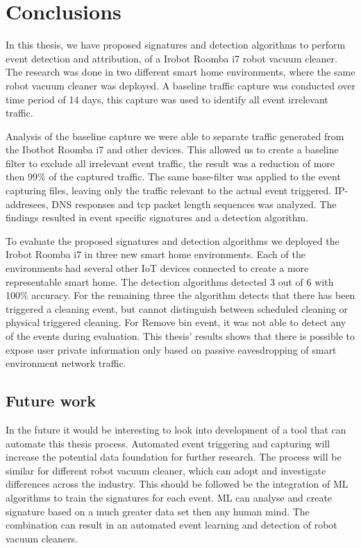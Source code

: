 \chapter{Conclusions}
In this thesis, we have proposed signatures and detection algorithms to perform event detection and attribution, of a Irobot Roomba i7 robot vacuum cleaner. The research was done in two different smart home environments, where the same robot vacuum cleaner was deployed. A baseline traffic capture was conducted over time period of 14 days, this capture was used to identify all event irrelevant traffic. 

Analysis of the baseline capture we were able to separate traffic generated from the Ibotbot Roomba i7 and other devices. This allowed us to create a baseline filter to exclude all irrelevant event traffic, the result was a reduction of more then 99\% of the captured traffic. The same base-filter was applied to the event capturing files, leaving only the traffic relevant to the actual event triggered. IP-addresees, DNS responses and tcp packet length sequences was analyzed. The findings resulted in event specific signatures and a detection algorithm. 

To evaluate the proposed signatures and detection algorithms we deployed the Irobot Roomba i7 in three new smart home environments. Each of the environments had several other IoT devices connected to create a more representable smart home. The detection algorithms detected 3 out of 6 with 100\% accuracy. For the remaining three the algorithm detects that there has been triggered a cleaning event, but cannot distinguish between scheduled cleaning or physical triggered cleaning. For Remove bin event, it was not able to detect any of the events during evaluation. This thesis' results shows that there is possible to expose user private information only based on passive eavesdropping of smart environment network traffic. 


\section{Future work}
In the future it would be interesting to look into development of a tool that can automate this thesis process. Automated event triggering and capturing will increase the potential data foundation for further research. The process will be similar for different robot vacuum cleaner, which can adopt and investigate differences across the industry.
This should be followed be the integration of ML algorithms to train the signatures for each event. ML can analyse and create signature based on a much greater data set then any human mind. The combination can result in an automated event learning and detection of robot vacuum cleaners. 



